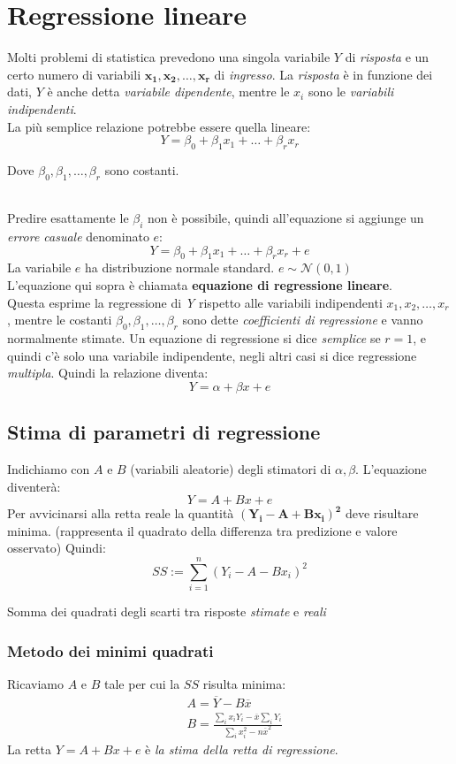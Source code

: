\documentclass[]{article}
\begin{document}
    \section{Regressione lineare}
    Molti problemi di statistica prevedono una singola variabile $Y$ di \emph{risposta} e un certo numero di variabili $\boldsymbol{x_1, x_2, \ldots, x_r}$ di \emph{ingresso}. La \emph{risposta} è in funzione dei dati, $Y$ è anche detta \emph{variabile dipendente}, mentre le $x_i$ sono le \emph{variabili indipendenti}.\\
    La più semplice relazione potrebbe essere quella lineare:
    \[ Y = \beta_0 + \beta_1x_1 + \ldots  + \beta_rx_r \]
    \centerline{Dove $\beta_0, \beta_1, \ldots, \beta_r$ sono costanti.} \\[2ex]
    Predire esattamente le $\beta_i$ non è possibile, quindi all'equazione si aggiunge un \emph{errore casuale} denominato $e$:
    \[ Y = \beta_0 + \beta_1x_1 + \ldots + \beta_rx_r + e \]
    La variabile $e$ ha distribuzione normale standard. $e \sim \mathcal N(0,1)$ \\
    L'equazione qui sopra è chiamata \textbf{equazione di regressione lineare}. \\
    Questa esprime la regressione di \emph{Y} rispetto alle variabili indipendenti $x_1, x_2, \ldots, x_r$, mentre le costanti $\beta_0, \beta_1, \ldots, \beta_r$ sono dette \emph{coefficienti di regressione} e vanno normalmente stimate.
    Un equazione di regressione si dice \emph{semplice} se $r = 1$, e quindi c'è solo una variabile indipendente, negli altri casi si dice regressione \emph{multipla}.
    Quindi la relazione diventa:
    \[ Y = \alpha + \beta x + e \]
    \subsection{Stima di parametri di regressione}
    Indichiamo con $A$ e $B$ (variabili aleatorie) degli stimatori di $\alpha, \beta$.
    L'equazione diventerà:
    \[ Y = A + Bx + e \]
    Per avvicinarsi alla retta reale la quantità $\boldsymbol{(Y_i - A + Bx_i)^2}$ deve risultare minima.
    (rappresenta il quadrato della differenza tra predizione e valore osservato)
    Quindi:
    \[ SS := \sum_{i = 1}^{n}(Y_i-A-Bx_i)^2 \]
    \centerline{Somma dei quadrati degli scarti tra risposte \textit{stimate} e \textit{reali}}
    \subsubsection{Metodo dei minimi quadrati}
    Ricaviamo $A$ e $B$ tale per cui la $SS$ risulta minima:
    \begin{equation*}
        \begin{split}
            &A = \overline Y - B \overline x \\
            &B = \frac{\sum_ix_iY_i - \overline{x}\sum_i Y_i }{\sum_i x_i^2 - n \overline x^2}
        \end{split}
    \end{equation*}
    La retta $Y = A + Bx + e$ è \emph{la stima della retta di regressione}.   
\end{document}
